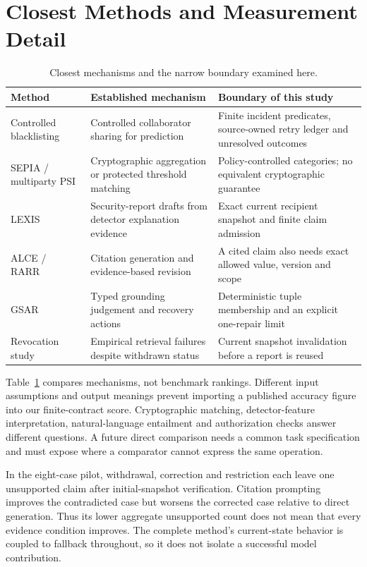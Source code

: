 \section{Closest Methods and Measurement Detail}
\begin{table}[t]
\centering\caption{Closest mechanisms and the narrow boundary examined here.}
\label{tab:closest}\footnotesize
\begin{tabular}{p{}p{}p{}}\hline
Method & Established mechanism & Boundary of this study\\\hline
Controlled blacklisting~\cite{freudiger} & Controlled collaborator sharing for prediction & Finite incident predicates, source-owned retry ledger and unresolved outcomes\\
SEPIA / multiparty PSI~\cite{sepia,psi} & Cryptographic aggregation or protected threshold matching & Policy-controlled categories; no equivalent cryptographic guarantee\\
LEXIS~\cite{lexis} & Security-report drafts from detector explanation evidence & Exact current recipient snapshot and finite claim admission\\
ALCE / RARR~\cite{alce,rarr} & Citation generation and evidence-based revision & A cited claim also needs exact allowed value, version and scope\\
GSAR~\cite{gsar} & Typed grounding judgement and recovery actions & Deterministic tuple membership and an explicit one-repair limit\\
Revocation study~\cite{revocation} & Empirical retrieval failures despite withdrawn status & Current snapshot invalidation before a report is reused\\\hline
\end{tabular}
\end{table}

Table~\ref{tab:closest} compares mechanisms, not benchmark rankings. Different input assumptions and output meanings prevent importing a published accuracy figure into our finite-contract score. Cryptographic matching, detector-feature interpretation, natural-language entailment and authorization checks answer different questions. A future direct comparison needs a common task specification and must expose where a comparator cannot express the same operation.

In the eight-case pilot, withdrawal, correction and restriction each leave one unsupported claim after initial-snapshot verification. Citation prompting improves the contradicted case but worsens the corrected case relative to direct generation. Thus its lower aggregate unsupported count does not mean that every evidence condition improves. The complete method's current-state behavior is coupled to fallback throughout, so it does not isolate a successful model contribution.

